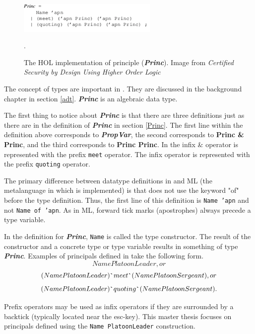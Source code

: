 \documentclass[../../main/main.tex]{subfiles}
\begin{document}
\begin{figure}[h]
\centering
\includegraphics[width=0.6\textwidth]{../figures/princHOL}
\caption{\label{princHOL}The HOL implementation of principle (\textbf{\textit{Princ}}).  Image from  \textit{Certified Security by Design Using Higher Order Logic}\cite{certmanual}}.  
\end{figure}

The concept of types are important in .  They are discussed in the background chapter in section \ref{adt}.  \textbf{\textit{Princ}} is an algebraic data type.  

The first thing to notice about  \textbf{\textit{Princ}} is that there are three definitions just as there are in the definition of  \textbf{\textit{Princ}} in section \ref{Princ}.   The first line within the definition above corresponds to \textbf{\textit{PropVar}}, the second corresponds to \textbf{Princ \& Princ}, and the third corresponds to \textbf{Princ \textbar  Princ}.  In  the infix \& operator is represented with the prefix \texttt{meet} operator.  The infix \textbar operator is represented with the prefix \texttt{quoting} operator.

The primary difference between datatype definitions in  and ML (the metalanguage in which  is implemented) is that  does not use the keyword "of" before the type definition.  Thus, the first line of this definition is \texttt{Name 'apn} and not \texttt{Name of 'apn}.  As in ML, forward tick marks (apostrophes) always precede a type variable. 


In the definition for  \textbf{\textit{Princ}}, \texttt{Name} is called the type constructor.  The result of the constructor and a concrete type or type variable results in something of type \textbf{\textit{Princ}}.  Examples of principals defined in  take the following form.
\[Name PlatoonLeader, or \]
\[(Name PlatoonLeader) \texttt{\textasciigrave} meet \texttt{\textasciigrave} (Name PlatoonSergeant), or \]
\[(Name PlatoonLeader) \texttt{\textasciigrave} quoting \texttt{\textasciigrave} (Name PlatoonSergeant). \]

Prefix operators may be used as infix operators if they are surrounded by a backtick \texttt{\textasciigrave} (typically located near the esc-key). This master thesis focuses on principals defined using the \texttt{Name PlatoonLeader} construction. 
\end{document}
